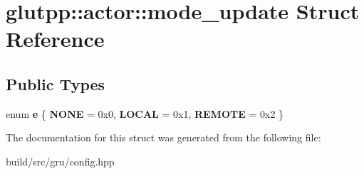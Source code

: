 \hypertarget{structglutpp_1_1actor_1_1mode__update}{\section{glutpp\-:\-:actor\-:\-:mode\-\_\-update \-Struct \-Reference}
\label{structglutpp_1_1actor_1_1mode__update}
}
\subsection*{\-Public \-Types}
\begin{DoxyCompactItemize}
\item 
enum {\bfseries e} \{ {\bfseries \-N\-O\-N\-E} =  0x0, 
{\bfseries \-L\-O\-C\-A\-L} =  0x1, 
{\bfseries \-R\-E\-M\-O\-T\-E} =  0x2
 \}
\end{DoxyCompactItemize}


\-The documentation for this struct was generated from the following file\-:\begin{DoxyCompactItemize}
\item 
build/src/gru/config.\-hpp\end{DoxyCompactItemize}
